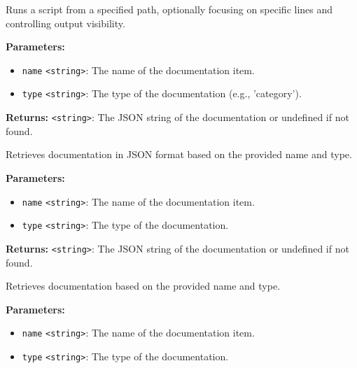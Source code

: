 \documentclass[12pt,a4paper]{article}
\begin{document}
\noindent Runs a script from a specified path, optionally focusing on specific lines and controlling output visibility.

\vspace{5mm}
\noindent {}


\noindent \textbf{Parameters:}
\begin{itemize}
  \item \texttt{name} \texttt{<string>}: The name of the documentation item.
  \item \texttt{type} \texttt{<string>}: The type of the documentation (e.g., 'category').
\end{itemize}

\noindent \textbf{Returns:} \texttt{<string>}: The JSON string of the documentation or undefined if not found.

\noindent Retrieves documentation in JSON format based on the provided name and type.

\vspace{5mm}
\noindent {}


\noindent \textbf{Parameters:}
\begin{itemize}
  \item \texttt{name} \texttt{<string>}: The name of the documentation item.
  \item \texttt{type} \texttt{<string>}: The type of the documentation.
\end{itemize}

\noindent \textbf{Returns:} \texttt{<string>}: The JSON string of the documentation or undefined if not found.

\noindent Retrieves documentation based on the provided name and type.

\vspace{5mm}
\noindent {}


\noindent \textbf{Parameters:}
\begin{itemize}
  \item \texttt{name} \texttt{<string>}: The name of the documentation item.
  \item \texttt{type} \texttt{<string>}: The type of the documentation.
\end{itemize}
\end{document}
